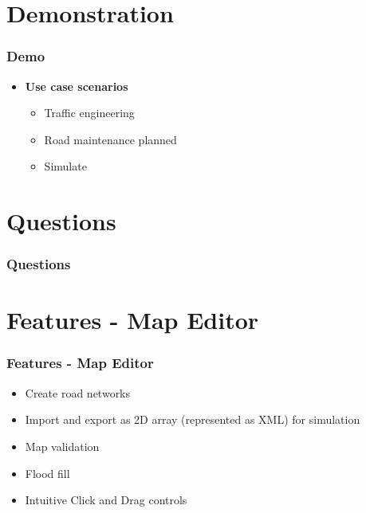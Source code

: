 \documentclass{beamer}
\begin{document}
\section{Demonstration}

\begin{frame}
\frametitle{Demo}

\begin{itemize}
\item \textbf{Use case scenarios}
	\begin{itemize}
		\item Traffic engineering 
		\item Road maintenance planned
		\item Simulate 
	\end{itemize}
\end{itemize}

\end{frame}

\section{Questions}

\begin{frame}
\frametitle{Questions}

\end{frame}


\section{Features - Map Editor}

\begin{frame}
\frametitle{Features - Map Editor}
	\begin{itemize}
		\item Create road networks
		\item Import and export as 2D array (represented as XML) for simulation 
		\item Map validation 
		\item Flood fill
		\item Intuitive Click and Drag controls 
	\end{itemize}


\end{frame}
\end{document}
